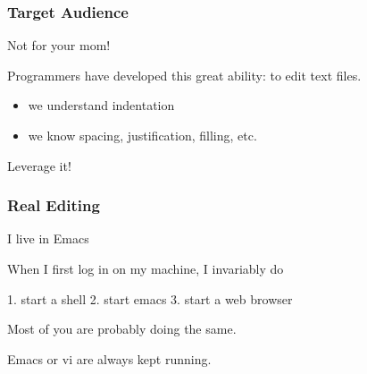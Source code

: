\documentclass{beamer}
\begin{document}
\begin{frame}[fragile]
  \frametitle{Target Audience}
 
 Not for your mom!
 
\pause
 Programmers have developed this great ability: to edit text files.
 
 \begin{itemize}
 \item we understand indentation
 \item we know spacing, justification, filling, etc.
 \end{itemize}
 
 Leverage it!
 
\end{frame}

 
\begin{frame}[fragile]
  \frametitle{Real Editing}

I live in Emacs

When I first log in on my machine, I invariably do

1. start a shell
2. start emacs
3. start a web browser

Most of you are probably doing the same.

Emacs or vi are always kept running.
 
\end{frame}
 



% 
% 
% 
% 
% 
% 
% 
% 
% 
% 
% 
% 
% 
% 
% 
% 
% 
% 
\end{document}
